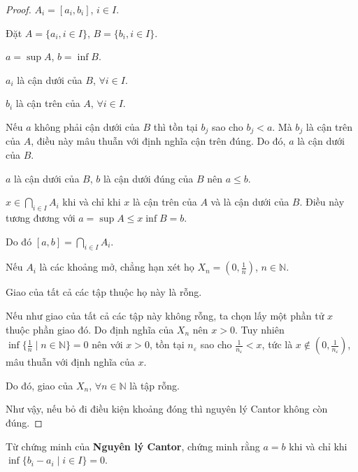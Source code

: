 \documentclass[class=analysis,crop=false]{standalone}
\begin{document}
\begin{proof}
    $A_{i} = [a_{i}, b_{i}]$, $i\in I$.
    \par Đặt $A = \{ a_{i}, i\in I \}$, $B = \{ b_{i}, i\in I \}$.
    \par $a = \sup A$, $b = \inf B$.
    \par $a_{i}$ là cận dưới của $B$, $\forall i\in I$.
    \par $b_{i}$ là cận trên của $A$, $\forall i\in I$.
    \par Nếu $a$ không phải cận dưới của $B$ thì tồn tại $b_{j}$ sao cho $b_{j} < a$. Mà $b_{j}$ là cận trên của $A$, điều này mâu thuẫn với định nghĩa cận trên đúng. Do đó, $a$ là cận dưới của $B$.
    \par $a$ là cận dưới của $B$, $b$ là cận dưới đúng của $B$ nên $a\le b$.
    \par $x\in \bigcap\limits_{i\in I}A_{i}$ khi và chỉ khi $x$ là cận trên của $A$ và là cận dưới của $B$. Điều này tương đương với $a = \sup A\le x\inf B = b$.
    \par Do đó $[a,b] = \bigcap\limits_{i\in I}A_{i}$.
    \bigskip
    \par Nếu $A_{i}$ là các khoảng mở, chẳng hạn xét họ $X_{n} = (0,\frac{1}{n})$, $n\in\mathbb{N}$.
    \par Giao của tất cả các tập thuộc họ này là rỗng.
    \par Nếu như giao của tất cả các tập này không rỗng, ta chọn lấy một phần tử $x$ thuộc phần giao đó. Do định nghĩa của $X_{n}$ nên $x > 0$. Tuy nhiên $\inf\{ \frac{1}{n} \mid n\in\mathbb{N} \} = 0$ nên với $x > 0$, tồn tại $n_{\varepsilon}$ sao cho $\frac{1}{n_{\varepsilon}} < x$, tức là $x\notin(0, \frac{1}{n_{\varepsilon}})$, mâu thuẫn với định nghĩa của $x$.
    \par Do đó, giao của $X_{n}$, $\forall n\in\mathbb{N}$ là tập rỗng.
    \par Như vậy, nếu bỏ đi điều kiện khoảng đóng thì nguyên lý Cantor không còn đúng.
\end{proof}

\begin{exercise}
    Từ chứng minh của \textbf{Nguyên lý Cantor}, chứng minh rằng $a = b$ khi và chỉ khi $\inf\{ b_{i} - a_{i}\mid i\in I \} = 0$.
\end{exercise}
\end{document}
